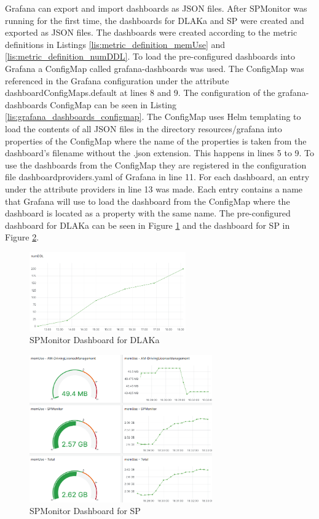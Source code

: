 Grafana can export and import dashboards as JSON files. After SPMonitor was running
for the first time, the dashboards for DLAKa and SP were created and exported as JSON files.
The dashboards were created according to the metric definitions in Listings \ref{lis:metric_definition_memUse}
and \ref{lis:metric_definition_numDDL}.
To load the pre-configured dashboards into Grafana a ConfigMap called grafana-dashboards was used.
The ConfigMap was referenced in the Grafana configuration under the attribute dashboardConfigMaps.default at lines 8 and 9.
The configuration of the grafana-dashboards ConfigMap can be seen in Listing \ref{lis:grafana_dashboards_configmap}.
The ConfigMap uses Helm templating to load the contents of all JSON files in the directory
resources/grafana into properties of the ConfigMap where the name of the properties is taken
from the dashboard's filename without the .json extension.
This happens in lines 5 to 9.
To use the dashboards from the ConfigMap they are registered in the configuration file dashboardproviders.yaml
of Grafana in line 11. For each dashboard, an entry under the attribute providers in line 13 was made.
Each entry contains a name that Grafana will use to load the dashboard from the ConfigMap
where the dashboard is located as a property with the same name.
The pre-configured dashboard for DLAKa can be seen in Figure \ref{fig:spmonitor_dlaka_dashboard}
and the dashboard for SP in Figure \ref{fig:spmonitor_sp_dashboard}.

\begin{figure}[tb]
  \centering
  \includegraphics[width=0.6\textwidth]{figures/6.5_spmonitor_dlaka_dashboard.png}
  \caption{SPMonitor Dashboard for DLAKa}
  \label{fig:spmonitor_dlaka_dashboard}
\end{figure}

\begin{figure}[tb]
  \centering
  \includegraphics[width=0.7\textwidth]{figures/6.6_spmonitor_sp_dashboard.png}
  \caption{SPMonitor Dashboard for SP}
  \label{fig:spmonitor_sp_dashboard}
\end{figure}

